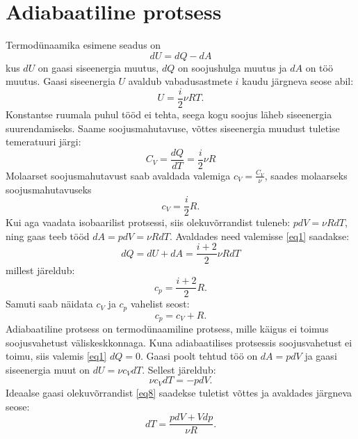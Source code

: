 \documentclass{trkut}%
\begin{document}
\section{Adiabaatiline protsess}
Termodünaamika esimene seadus on
\begin{equation}\label{eq1}
dU = dQ - dA
\end{equation}
kus $dU$ on gaasi siseenergia muutus, $dQ$ on soojushulga muutus ja $dA$ on töö muutus. Gaasi siseenergia $U$ avaldub vabadusastmete $i$ kaudu järgneva seose abil:
\begin{equation}\label{eq5}
U = \frac{i}{2} \nu R T.
\end{equation}
Konstantse ruumala puhul tööd ei tehta, seega kogu soojus läheb siseenergia suurendamiseks. Saame soojusmahutavuse, võttes siseenergia muudust tuletise temeratuuri järgi:
\begin{equation}\label{eq6}
C_V = \frac{dQ}{dT}=\frac{i}{2}\nu R
\end{equation}
Molaarset soojusmahutavust saab avaldada valemiga $c_V = \frac{C_V}{\nu}$, saades molaarseks soojusmahutavuseks
\begin{equation}\label{eq7}
c_V = \frac{i}{2}R.
\end{equation}
Kui aga vaadata isobaarilist protsessi, siis olekuvõrrandist tuleneb: $pdV=\nu RdT$, ning gaas teeb tööd $dA = pdV = \nu RdT$. Avaldades need valemisse \ref{eq1} saadakse:
\begin{equation*}
dQ = dU + dA = \frac{i+2}{2} \nu R dT
\end{equation*}
millest järeldub:
\begin{equation*}
c_p=\frac{i+2}{2}R.
\end{equation*}
Samuti saab näidata $c_V$ ja $c_p$ vahelist seost:
\begin{equation}\label{eq9}
c_p = c_V + R.
\end{equation}
Adiabaatiline protsess on termodünaamiline protsess, mille käigus ei toimus soojusvahetust väliskeskkonnaga. Kuna adiabaatilises protsessis soojusvahetust ei toimu, siis valemis \ref{eq1} $dQ=0$. Gaasi poolt tehtud töö on $d A=pdV$ ja gaasi siseenergia muut on $dU=\nu c_VdT$. Sellest järeldub:
\begin{equation}\label{eq2}
\nu c_VdT = -pdV.
\end{equation}
Ideaalse gaasi olekuvõrrandist \ref{eq8} saadekse tuletist võttes ja avaldades järgneva seose:
\begin{equation}\label{eq3}
dT = \frac{pdV+Vdp}{\nu R}.
\end{equation}
\end{document}
